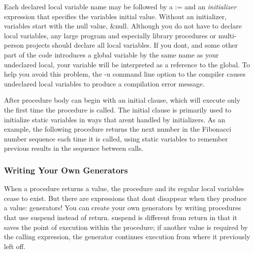 Each declared local variable name may be followed by a \textsf{:=} and
an \textit{initializer} expression that specifies the
variable{\textquotesingle}s initial value. Without an initializer,
variables start with the null value, \textsf{\&null}\textit{. }Although
you do not have to declare local variables, any large program and
especially library procedures or multi-person projects should declare
all local variables. If you don{\textquotesingle}t, and some other part
of the code introduces a global variable by the same name as your
undeclared local, your variable will be interpreted as a
reference to the global. To help you avoid this
problem, the \textsf{{}-u} command line option to the
compiler causes undeclared
local variables to produce a compilation error message.

After procedure body can begin with an \textsf{initial} clause, which will execute only the first time
the procedure is called. The \textsf{initial} clause is primarily used
to initialize static variables in ways that aren{\textquotesingle}t
handled by initializers. As an example, the following procedure returns
the next number in the Fibonacci number sequence each time it is
called, using static variables to remember previous results in the
sequence between calls.


\subsubsection[Writing Your Own Generators]{Writing Your Own Generators}

When a procedure returns a value, the procedure and its
regular local variables cease to exist. But there are expressions that
don{\textquotesingle}t disappear when they produce a value: generators!
You can create your own generators by writing procedures that use
\textsf{suspend} instead of \textsf{return. suspend} is different from
\textsf{return} in that it saves the point of execution within the
procedure; if another value is required by the calling expression, the
generator continues execution from where it previously left off.

